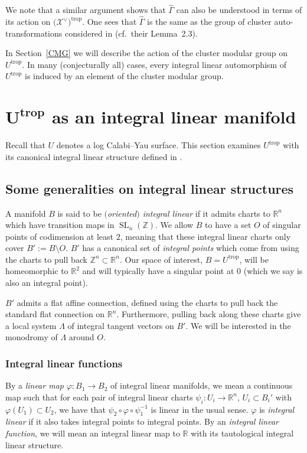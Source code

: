 \documentclass[pdftex]{sigma}
\numberwithin{equation}{section}
\numberwithin{figure}{section}
\numberwithin{table}{section}
\DeclareMathOperator{\SL}{SL}
\DeclareMathOperator{\trop}{trop}
\let\bb=\mathbb
\let\rar=\rightarrow
\let\s=\mathcal
\let\wh=\widehat
\theoremstyle{definition}
\begin{document}
We note that a similar argument shows that $\wh{\Gamma}$ can also be understood in terms of its action on $\big(\s{X}^{\vee}\big)^{\trop}$. One sees that $\wh{\Gamma}$ is the same as the group of cluster auto-transformations considered in \cite{ASS} (cf.\ their Lemma~2.3).

In Section~\ref{CMG} we will describe the action of the cluster modular group on $U^{\trop}$. In many (conjecturally all) cases, every integral linear automorphism of $U^{\trop}$ is induced by an element of the cluster modular group.

\section[$U^{\trop}$ as an integral linear manifold]{$\boldsymbol{U^{\trop}}$ as an integral linear manifold} \label{tropu}
Recall that $U$ denotes a log Calabi--Yau surface. This section examines $U^{\trop}$ with its canonical integral linear structure defined in \cite{GHK1}.

\subsection{Some generalities on integral linear structures} \label{ils}

A manifold $B$ is said to be {\it $($oriented$)$ integral linear} if it admits charts to $\bb{R}^n$ which have transition maps in $\SL_n(\bb{Z})$. We allow $B$ to have a set $O$ of singular points of codimension at least $2$, meaning that these integral linear charts only cover $B':=B\setminus O$. $B'$ has a canonical set of {\it integral points} which come from using the charts to pull back $\bb{Z}^n\subset \bb{R}^n$. Our space of interest, $B=U^{\trop}$, will be homeomorphic to $\bb{R}^2$ and will typically have a singular point at $0$ (which we say is also an integral point).

$B'$ admits a flat affine connection, defined using the charts to pull back the standard flat connection on $\bb{R}^n$. Furthermore, pulling back along these charts give a local system $\Lambda$ of integral tangent vectors on $B'$. We will be interested in the monodromy of $\Lambda$ around $O$.

\subsubsection{Integral linear functions}\label{int lin fun}

By a {\it linear map} $\varphi\colon B_1\rar B_2$ of integral linear manifolds, we mean a continuous map such that for each pair of integral linear charts $\psi_i\colon U_i\rar \bb{R}^n$, $U_i\subset B_i'$ with $\varphi(U_1)\subset U_2$, we have that $\psi_2\circ \varphi\circ \psi_1^{-1}$ is linear in the usual sense. $\varphi$ is {\it integral linear} if it also takes integral points to integral points. By an {\it integral linear function}, we will mean an integral linear map to $\bb{R}$ with its tautological integral linear structure.
\end{document}
